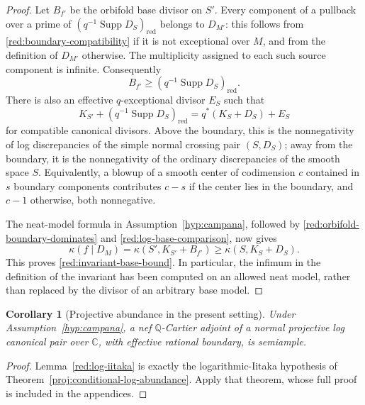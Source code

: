 \documentclass[11pt,letterpaper]{article}
\newtheorem{corollary}[theorem]{Corollary}
\theoremstyle{definition}
\theoremstyle{remark}
\begin{document}
\begin{proof}
Let \(B_{f'}\) be the orbifold base divisor on \(S'\). Every component
of a pullback over a prime of
\((q^{-1}\operatorname{Supp} D_S)_{\mathrm{red}}\) belongs to \(D_{M'}\): this follows
from \eqref{red:boundary-compatibility} if it is not exceptional over
\(M\), and from the definition of \(D_{M'}\) otherwise. The multiplicity
assigned to each such source component is infinite. Consequently
\begin{equation}\label{red:orbifold-boundary-dominates}
 B_{f'}\geq(q^{-1}\operatorname{Supp} D_S)_{\mathrm{red}}.
\end{equation}
There is also an effective \(q\)-exceptional divisor \(E_S\) such that
\begin{equation}\label{red:log-base-comparison}
 K_{S'}+(q^{-1}\operatorname{Supp} D_S)_{\mathrm{red}}
   =q^*(K_S+D_S)+E_S
\end{equation}
for compatible canonical divisors. Above the boundary, this is the
nonnegativity of log discrepancies of the simple normal crossing pair
\((S,D_S)\); away from the boundary, it is the nonnegativity of the
ordinary discrepancies of the smooth space \(S\). Equivalently, a
blowup of a smooth center of codimension \(c\) contained in \(s\) boundary
components contributes \(c-s\) if the center lies in the boundary, and
\(c-1\) otherwise, both nonnegative.

The neat-model formula in Assumption~\ref{hyp:campana}, followed by
\eqref{red:orbifold-boundary-dominates} and
\eqref{red:log-base-comparison}, now gives
\[
 \kappa(f\mid D_M)
 =\kappa(S',K_{S'}+B_{f'})
 \geq\kappa(S,K_S+D_S).
\]
This proves \eqref{red:invariant-base-bound}. In particular, the infimum
in the definition of the invariant has been computed on an allowed neat
model, rather than replaced by the divisor of an arbitrary base model.
\end{proof}

\begin{corollary}[Projective abundance in the present setting]
\label{red:projective}
Under Assumption~\ref{hyp:campana}, a nef \(\mathbb{Q}\)-Cartier adjoint of a
normal projective log canonical pair over \(\mathbb{C}\), with effective rational
boundary, is semiample.
\end{corollary}

\begin{proof}
Lemma~\ref{red:log-iitaka} is exactly the logarithmic-Iitaka hypothesis
of Theorem~\ref{proj:conditional-log-abundance}. Apply that theorem,
whose full proof is included in the appendices.
\end{proof}
\end{document}
